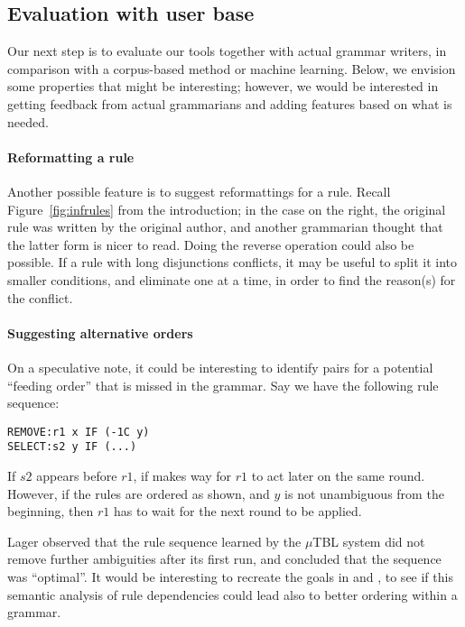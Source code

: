 {{\subsection{Evaluation with user base}

Our next step is to evaluate our tools together with actual grammar writers,
in comparison with a corpus-based method or machine learning. 
Below, we envision some properties that might be interesting; however, we would be interested in getting feedback from actual grammarians and adding features based on what is needed.

\paragraph{Reformatting a rule}

Another possible feature is to suggest reformattings for a rule. Recall
Figure~\ref{fig:infrules} from the introduction; in the case on the right, the
original rule was written by the original author, and another
grammarian thought that the latter form is nicer to read. Doing the
reverse operation could also be possible. If a rule with long
disjunctions conflicts, it may be useful to split it into smaller
conditions, and eliminate one at a time, in order to find the
reason(s) for the conflict.


\paragraph{Suggesting alternative orders} 
On a speculative note, it could be interesting to identify pairs for a potential ``feeding order'' that is missed in the grammar. Say we have the following rule sequence:

\begin{verbatim}
REMOVE:r1 x IF (-1C y)
SELECT:s2 y IF (...)
\end{verbatim}

If $s2$ appears before $r1$, if makes way for $r1$ to act later on the same round. 
However, if the rules are ordered as shown, and $y$ is not unambiguous from the beginning, then $r1$ has to wait for the next round to be applied.



Lager \cite{lager01transformation} observed that the rule sequence learned by the $\mu$TBL system did not remove further ambiguities after its first run, and concluded that the sequence was ``optimal''. 
It would be interesting to recreate the goals in \cite{lager01transformation} and \cite{bick2013tuning}, to see if this semantic analysis of rule dependencies could lead also to better ordering within a grammar.

}}
